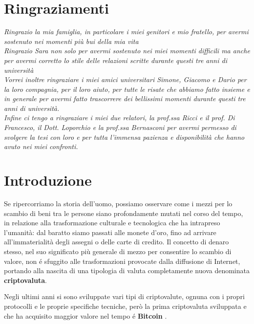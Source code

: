 \chapter*{Ringraziamenti} %
\begin{flushright}
\itshape 
Ringrazio la mia famiglia, in particolare i miei genitori e mio fratello, per avermi sostenuto nei momenti più bui della mia vita\\
Ringrazio Sara non solo per avermi sostenuto nei miei momenti difficili ma anche per avermi corretto lo stile delle relazioni scritte durante questi tre anni di università\\ 
Vorrei inoltre ringraziare i miei amici universitari Simone, Giacomo e Dario per la loro compagnia, per il loro aiuto, per tutte le risate che abbiamo fatto insieme e in generale per avermi fatto trascorrere dei bellissimi momenti durante questi tre anni di università.\\
Infine ci tengo a ringraziare i miei due relatori, la prof.ssa Ricci e il prof. Di Francesco, il Dott. Loporchio e la prof.ssa Bernasconi per avermi permesso di svolgere la tesi con loro e per tutta l'immensa pazienza e disponibilità che hanno avuto nei miei confronti.
\end{flushright}


\chapter{Introduzione}
Se ripercorriamo la storia dell'uomo, possiamo osservare come i mezzi per lo scambio di beni tra le persone siano profondamente mutati nel corso del tempo, in relazione alla trasformazione culturale e tecnologica che ha intrapreso l'umanità: dal baratto siamo passati alle monete d’oro, fino ad arrivare all’immaterialità degli assegni o delle carte di credito. Il concetto di denaro stesso, nel suo significato più generale di mezzo per consentire lo scambio di valore, non é sfuggito alle trasformazioni provocate dalla diffusione di Internet, portando alla nascita di una tipologia di valuta completamente nuova denominata \textbf{criptovaluta}. 

Negli ultimi anni si sono sviluppate vari tipi di criptovalute, ognuna con i propri protocolli e le proprie specifiche tecniche, però la prima criptovaluta sviluppata e che ha acquisito maggior valore nel tempo é \textbf{Bitcoin} \cite{btcbook}. 

